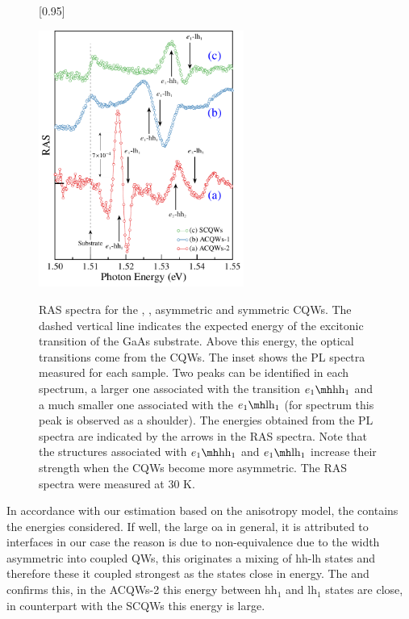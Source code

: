 \begin{figure}[H]
	[0.95\FBwidth]
	{\caption{RAS spectra for the , , asymmetric and  symmetric CQWs. The dashed vertical line indicates the expected energy of the excitonic transition of the GaAs substrate. Above this energy, the optical transitions come from the CQWs. The inset shows the PL spectra measured for each sample. Two peaks can be identified in each spectrum, a larger one associated with the transition $\thh{1}{1}$ and a much smaller one associated with the $\tlh{1}{1}$ (for spectrum  this peak is observed as a shoulder). The energies obtained from the PL spectra are indicated by the arrows in the RAS spectra. Note that the structures associated with $\thh{1}{1}$ and $\tlh{1}{1}$ increase their strength when the \gls{CQWs} become more asymmetric. The RAS spectra were measured at 30 K.
	}\label{fig:chapter-3-subsec-ras-plots-set-3}}
	{
	\includegraphics[width=0.6\textwidth]{../figures/chapter-3/ras-plots/build-ruco/ras-set-3.pdf}
	\label{subfig:chapter-3-subsubsec-ras-strength-set-3-a}
	\label{subfig:chapter-3-subsubsec-ras-strength-set-3-b}
	\label{subfig:chapter-3-subsubsec-ras-strength-set-3-c}
	}
\end{figure}
In accordance with our estimation based on the anisotropy model, the  contains the energies considered. If well, the large \gls{oa}  in general, it is attributed to interfaces in our case the reason is due to non-equivalence due to the width asymmetric into coupled \gls{QW}s, this originates a mixing of hh-lh states and therefore these it coupled strongest as the states close in energy\cite{winkler2003spin}. The  and  confirms this, in the ACQWs-2 this energy between $\mathrm{hh_1}$ and $\mathrm{lh_1}$ states are close, in counterpart with the  \gls{SCQWs}  this energy is large.\\

